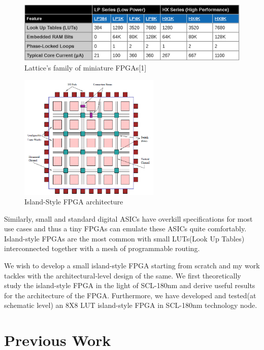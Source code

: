 \begin{figure}[h]
\centering
\includegraphics[width=0.9\linewidth]{lattice_tiny_family.png}
\caption{Lattice's family of miniature FPGAs[1]}
\label{fig:Figure}
\end{figure}

\begin{figure}[h]
\centering
\includegraphics[width=0.6\textwidth]{Island-style.png}
\caption{Island-Style FPGA architecture}
\label{fig:Figure}
\end{figure}
Similarly, small and standard digital ASICs have overkill specifications for most use cases and thus a tiny FPGAs can emulate these ASICs quite comfortably. Island-style FPGAs are the most common with small LUTs(Look Up Tables) interconnected together with a mesh of programmable routing. 

We wish to develop a small island-style FPGA starting from scratch and my work tackles with the architectural-level design of the same. We first theoretically study the island-style FPGA in the light of SCL-180nm and derive useful results for the architecture of the FPGA. Furthermore, we have developed and tested(at schematic level) an 8X8 LUT island-style FPGA in SCL-180nm technology node.


\section{Previous Work}

\paragraph{}

